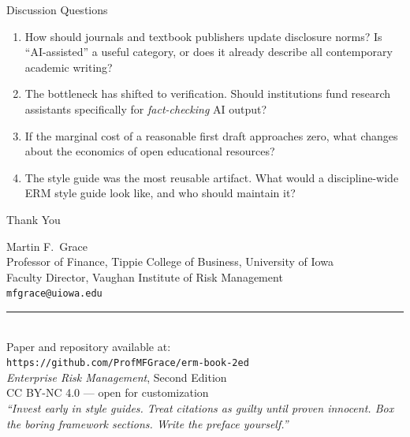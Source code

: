 \documentclass[11pt, aspectratio=169]{beamer}
\begin{document}

\begin{frame}{Discussion Questions}
\begin{enumerate}
  \item How should journals and textbook publishers update disclosure norms?
        Is ``AI-assisted'' a useful category, or does it already describe
        all contemporary academic writing?
  \item The bottleneck has shifted to verification. Should institutions fund
        research assistants specifically for \emph{fact-checking} AI output?
  \item If the marginal cost of a reasonable first draft approaches zero,
        what changes about the economics of open educational resources?
  \item The style guide was the most reusable artifact. What would a discipline-wide
        ERM style guide look like, and who should maintain it?
\end{enumerate}
\end{frame}

\begin{frame}{Thank You}
\begin{center}
{\large Martin F.\ Grace}\\[6pt]
Professor of Finance, Tippie College of Business, University of Iowa\\
Faculty Director, Vaughan Institute of Risk Management\\[10pt]
\texttt{mfgrace@uiowa.edu}\\[14pt]
{\color{ERMDarkGold}\rule{0.5\textwidth}{0.8pt}}\\[10pt]
\small Paper and repository available at:\\
\texttt{https://github.com/ProfMFGrace/erm-book-2ed}\\[6pt]
\textit{Enterprise Risk Management}, Second Edition\\
CC BY-NC 4.0 --- open for customization\\[10pt]
\normalsize\itshape
``Invest early in style guides.
Treat citations as guilty until proven innocent.
Box the boring framework sections.
Write the preface yourself.''
\end{center}
\end{frame}

\end{document}
